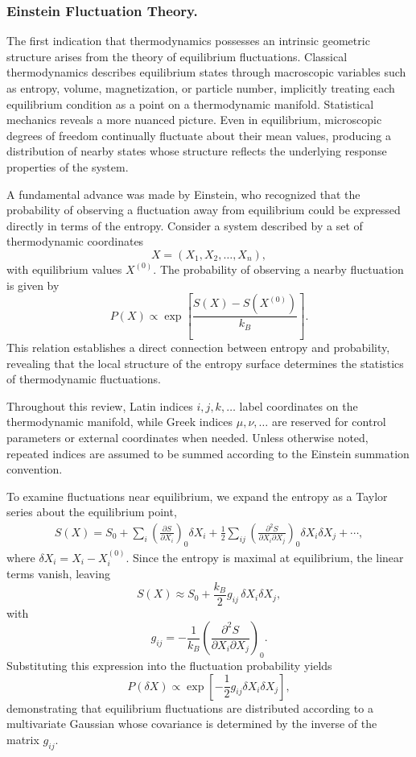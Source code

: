 \subsubsection{Einstein Fluctuation Theory.}

The first indication that thermodynamics possesses an intrinsic geometric structure arises from the theory of equilibrium fluctuations. Classical thermodynamics describes equilibrium states through macroscopic variables such as entropy, volume, magnetization, or particle number, implicitly treating each equilibrium condition as a point on a thermodynamic manifold. Statistical mechanics reveals a more nuanced picture. Even in equilibrium, microscopic degrees of freedom continually fluctuate about their mean values, producing a distribution of nearby states whose structure reflects the underlying response properties of the system.

A fundamental advance was made by Einstein, who recognized that the probability of observing a fluctuation away from equilibrium could be expressed directly in terms of the entropy. Consider a system described by a set of thermodynamic coordinates
\[
X=(X_1,X_2,\ldots,X_n),
\]
with equilibrium values \(X^{(0)}\). The probability of observing a nearby fluctuation is given by
\[
P(X)
\propto
\exp\left[
\frac{S(X)-S(X^{(0)})}{k_B}
\right].
\]
This relation establishes a direct connection between entropy and probability, revealing that the local structure of the entropy surface determines the statistics of thermodynamic fluctuations.

Throughout this review, Latin indices \(i,j,k,\ldots\) label coordinates on the thermodynamic manifold, while Greek indices \(\mu,\nu,\ldots\) are reserved for control parameters or external coordinates when needed. Unless otherwise noted, repeated indices are assumed to be summed according to the Einstein summation convention.

To examine fluctuations near equilibrium, we expand the entropy as a Taylor series about the equilibrium point,
\begin{align}
S(X)
=
S_0
+
\sum_i
\left(
\frac{\partial S}{\partial X_i}
\right)_0
\delta X_i
+
\frac12
\sum_{ij}
\left(
\frac{\partial^2 S}
{\partial X_i\partial X_j}
\right)_0
\delta X_i\delta X_j
+\cdots ,
\end{align}
where \(\delta X_i = X_i-X_i^{(0)}\). Since the entropy is maximal at equilibrium, the linear terms vanish, leaving
\[
S(X)
\approx
S_0
+
\frac{k_B}{2}
g_{ij}\,
\delta X_i\delta X_j ,
\]
with
\[
g_{ij}
=
-\frac{1}{k_B}
\left(
\frac{\partial^2 S}
{\partial X_i\partial X_j}
\right)_0 .
\]
Substituting this expression into the fluctuation probability yields
\[
P(\delta X)
\propto
\exp
\left[
-\frac12
g_{ij}
\delta X_i\delta X_j
\right],
\]
demonstrating that equilibrium fluctuations are distributed according to a multivariate Gaussian whose covariance is determined by the inverse of the matrix \(g_{ij}\).


